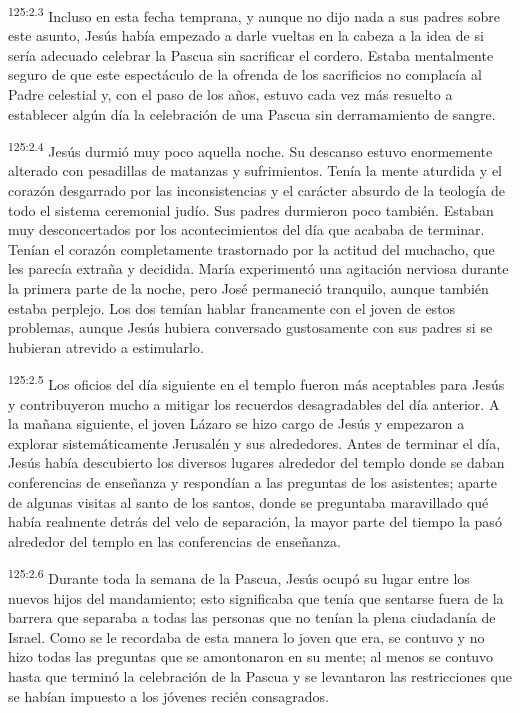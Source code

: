 \par 
\textsuperscript{125:2.3} Incluso en esta fecha temprana, y aunque no dijo nada a sus padres sobre este asunto, Jesús había empezado a darle vueltas en la cabeza a la idea de si sería adecuado celebrar la Pascua sin sacrificar el cordero. Estaba mentalmente seguro de que este espectáculo de la ofrenda de los sacrificios no complacía al Padre celestial y, con el paso de los años, estuvo cada vez más resuelto a establecer algún día la celebración de una Pascua sin derramamiento de sangre.

\par 
\textsuperscript{125:2.4} Jesús durmió muy poco aquella noche. Su descanso estuvo enormemente alterado con pesadillas de matanzas y sufrimientos. Tenía la mente aturdida y el corazón desgarrado por las inconsistencias y el carácter absurdo de la teología de todo el sistema ceremonial judío. Sus padres durmieron poco también. Estaban muy desconcertados por los acontecimientos del día que acababa de terminar. Tenían el corazón completamente trastornado por la actitud del muchacho, que les parecía extraña y decidida. María experimentó una agitación nerviosa durante la primera parte de la noche, pero José permaneció tranquilo, aunque también estaba perplejo. Los dos temían hablar francamente con el joven de estos problemas, aunque Jesús hubiera conversado gustosamente con sus padres si se hubieran atrevido a estimularlo.

\par 
\textsuperscript{125:2.5} Los oficios del día siguiente en el templo fueron más aceptables para Jesús y contribuyeron mucho a mitigar los recuerdos desagradables del día anterior. A la mañana siguiente, el joven Lázaro se hizo cargo de Jesús y empezaron a explorar sistemáticamente Jerusalén y sus alrededores. Antes de terminar el día, Jesús había descubierto los diversos lugares alrededor del templo donde se daban conferencias de enseñanza y respondían a las preguntas de los asistentes; aparte de algunas visitas al santo de los santos, donde se preguntaba maravillado qué había realmente detrás del velo de separación, la mayor parte del tiempo la pasó alrededor del templo en las conferencias de enseñanza.

\par 
\textsuperscript{125:2.6} Durante toda la semana de la Pascua, Jesús ocupó su lugar entre los nuevos hijos del mandamiento; esto significaba que tenía que sentarse fuera de la barrera que separaba a todas las personas que no tenían la plena ciudadanía de Israel. Como se le recordaba de esta manera lo joven que era, se contuvo y no hizo todas las preguntas que se amontonaron en su mente; al menos se contuvo hasta que terminó la celebración de la Pascua y se levantaron las restricciones que se habían impuesto a los jóvenes recién consagrados.


